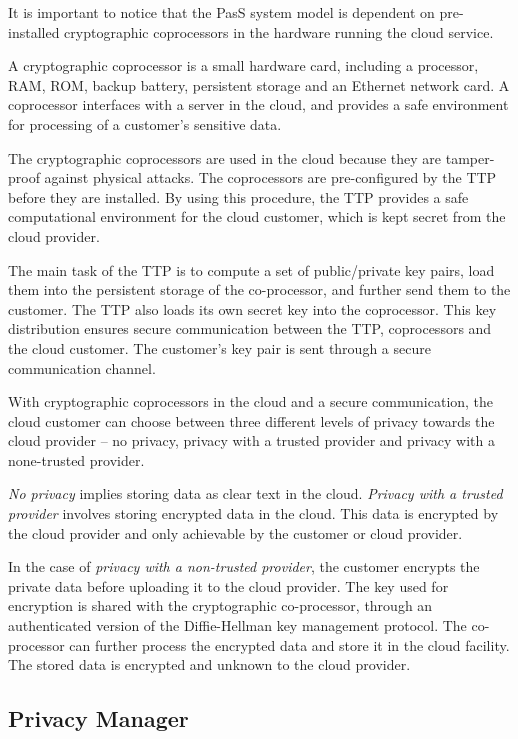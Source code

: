 \documentclass[pdftex,english,10pt,b5paper,twoside]{book}
\begin{document}
It is important to notice that the \ac{PasS} system model is dependent on
pre-installed cryptographic coprocessors in the hardware running the cloud
service.

A cryptographic coprocessor is a small hardware card, including a processor,
\ac{RAM}, \ac{ROM}, backup battery, persistent storage and an Ethernet network
card. A coprocessor interfaces with a server in the cloud, and provides a safe
environment for processing of a customer's sensitive data. 

The cryptographic coprocessors are used in the cloud because they are
tamper-proof against physical attacks. The coprocessors are pre-configured by
the \ac{TTP} before they are installed. By using this procedure, the \ac{TTP}
provides a safe computational environment for the cloud customer, which is kept
secret from the cloud provider.

The main task of the \ac{TTP} is to compute a set of public/private key pairs,
load them into the persistent storage of the co-processor, and further send
them to the customer. The \ac{TTP} also loads its own secret key into the
coprocessor. This key distribution ensures secure communication between the
\ac{TTP}, coprocessors and the cloud customer. The customer's key pair is sent
through a secure communication channel.

With cryptographic coprocessors in the cloud and a secure communication, the
cloud customer can choose between three different levels of privacy towards the
cloud provider -- no privacy, privacy with a trusted provider and privacy with
a none-trusted provider.

\emph{No privacy} implies storing data as clear text in the cloud.
\emph{Privacy with a trusted provider} involves storing encrypted data in the
cloud. This data is encrypted by the cloud provider and only achievable by the
customer or cloud provider. 

In the case of \emph{privacy with a non-trusted provider}, the customer
encrypts the private data before uploading it to the cloud provider. The key
used for encryption is shared with the cryptographic co-processor, through an
authenticated version of the Diffie-Hellman key management protocol. The
co-processor can further process the encrypted data and store it in the cloud
facility. The stored data is encrypted and unknown to the cloud provider.

\subsection{Privacy Manager}
\end{document}
